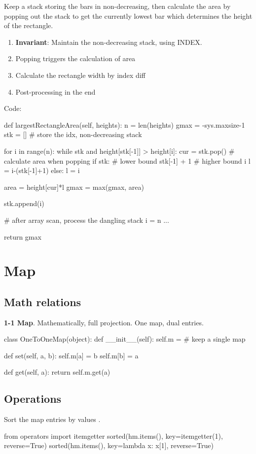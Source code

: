 Keep a stack storing the bars in non-decreasing, then calculate the area by popping out the stack to get the currently lowest bar which determines the height of the rectangle.
\\
\begin{enumerate}
\item \textbf{Invariant}: Maintain the non-decreasing stack, using INDEX.
\item Popping triggers the calculation of area
\item Calculate the rectangle width by index diff
\item Post-processing in the end
\end{enumerate}

Code:
\begin{python}
def largestRectangleArea(self, heights):
    n = len(heights)
    gmax = -sys.maxsize-1
    stk = []  # store the idx, non-decreasing stack

    for i in range(n):
        while stk and height[stk[-1]] > height[i]:
            cur = stk.pop()
            # calculate area when popping
            if stk:
                # lower bound stk[-1] + 1
                # higher bound i 
                l = i-(stk[-1]+1)
            else:
            	l = i
	
            area = height[cur]*l
            gmax = max(gmax, area)

        stk.append(i)

    # after array scan, process the dangling stack
    i = n
    ...

    return gmax
\end{python}

\section{Map}
\subsection{Math relations}
\textbf{1-1 Map}. Mathematically, full projection. One map, dual entries.
\begin{python}
class OneToOneMap(object):
    def __init__(self):
        self.m = {}  # keep a single map

    def set(self, a, b):
        self.m[a] = b
        self.m[b] = a

    def get(self, a):
        return self.m.get(a)
\end{python}
\subsection{Operations}
 Sort the map entries by values .
\begin{python}
from operators import itemgetter 
sorted(hm.items(), key=itemgetter(1), reverse=True)
sorted(hm.items(), key=lambda x: x[1], reverse=True)
\end{python}

